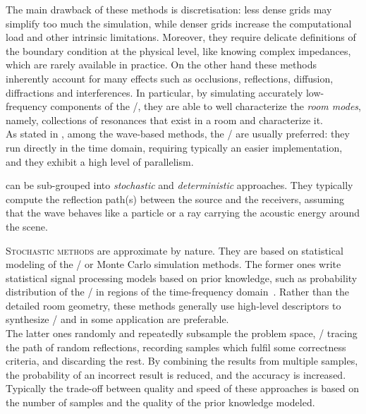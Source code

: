 \mynewline
The main drawback of these methods is discretisation:
less dense grids may simplify too much the simulation, while denser grids increase the computational load and other intrinsic limitations.
Moreover, they require delicate definitions of the boundary condition at the physical level,
like knowing complex impedances, which are rarely available in practice.
On the other hand these methods inherently account for many effects such as occlusions, reflections, diffusion, diffractions and interferences.
In particular, by simulating accurately low-frequency components of the \RIR/, they are able to well characterize the \textit{room modes}, namely, collections of resonances that exist in a room and characterize it.
\\As stated in , among the wave-based methods, the \DWMs/ are usually preferred:
they run directly in the time domain, requiring typically an easier implementation, and they exhibit a high level of parallelism.

 can be sub-grouped into \textit{stochastic} and \textit{deterministic} approaches.
They typically compute the reflection path(s) between the source and the receivers,
assuming that the wave behaves like a particle or a ray carrying the acoustic energy around the scene.

\mynewline
\textsc{Stochastic methods} are approximate by nature.
They are based on statistical modeling of the \RIRs/ or Monte Carlo simulation methods.
The former ones write statistical signal processing models based on prior knowledge,
such as probability distribution of the \RIR/ in regions of the time-frequency domain~.
Rather than the detailed room geometry, these methods generally use high-level descriptors
to synthesize \RIRs/ and in some application are preferable.
\\The latter ones randomly and repeatedly subsample the problem space, \eg/ tracing the path of random reflections,
recording samples which fulfil some correctness criteria, and discarding the rest.
By combining the results from multiple samples, the probability of an incorrect result is reduced, and the accuracy is increased.
Typically the trade-off between quality and speed of these approaches is based on the number of samples and
the quality of the prior knowledge modeled.

